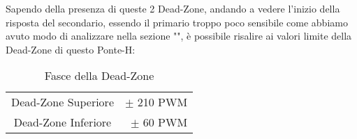 \begin{enumerate}
\end{enumerate}
\noindent
Sapendo della presenza di queste 2 Dead-Zone, andando a vedere l'inizio della risposta del secondario, essendo il primario troppo poco sensibile come abbiamo avuto modo di analizzare nella sezione "", è possibile risalire ai valori limite della Dead-Zone di questo Ponte-H:
\begin{table}[h]
	\centering
	\caption[Fasce della Dead-Zone]{Fasce della Dead-Zone}
	\begin{tabular}[t]{||c r||}
		\hline
		Dead-Zone Superiore & $\pm$ 210 PWM \\
		Dead-Zone Inferiore & $\pm$ 60  PWM \\
		\hline
	\end{tabular}
\end{table}
